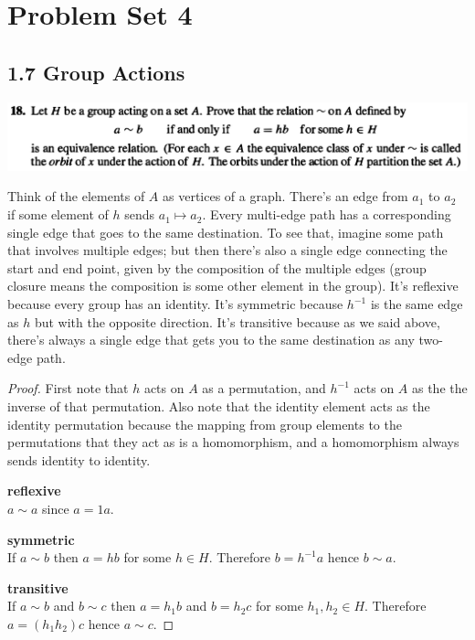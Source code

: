 
\section*{Problem  Set 4}

\subsection*{1.7 Group Actions}


\begin{mdframed}
\includegraphics[width=400pt]{img/abstract-algebra--nf--4-bc71.png}
\end{mdframed}

\begin{intuition*}
  Think of the elements of $A$ as vertices of a graph. There's an edge from $a_1$ to $a_2$ if some
  element of $h$ sends $a_1 \mapsto a_2$. Every multi-edge path has a corresponding single edge that goes
  to the same destination. To see that, imagine some path that involves multiple edges; but then
  there's also a single edge connecting the start and end point, given by the composition of the
  multiple edges (group closure means the composition is some other element in the group). It's
  reflexive because every group has an identity. It's symmetric because $h^{-1}$ is the same edge
  as $h$ but with the opposite direction. It's transitive because as we said above, there's always
  a single edge that gets you to the same destination as any two-edge path.
\end{intuition*}

\begin{proof}
  First note that $h$ acts on $A$ as a permutation, and $h^{-1}$ acts on $A$ as the the inverse of
  that permutation. Also note that the identity element acts as the identity permutation because
  the mapping from group elements to the permutations that they act as is a homomorphism, and a
  homomorphism always sends identity to identity.

  {\bf reflexive}\\
  $a \sim a$ since $a = 1a$.

  {\bf symmetric}\\
  If $a \sim b$ then $a = hb$ for some $h \in H$. Therefore $b = h^{-1}a$ hence $b \sim a$.

  {\bf transitive}\\
  If $a \sim b$ and $b \sim c$ then $a = h_1b$ and $b = h_2c$ for some $h_1, h_2 \in H$.
  Therefore $a = (h_1h_2)c$ hence $a \sim c$.
\end{proof}

